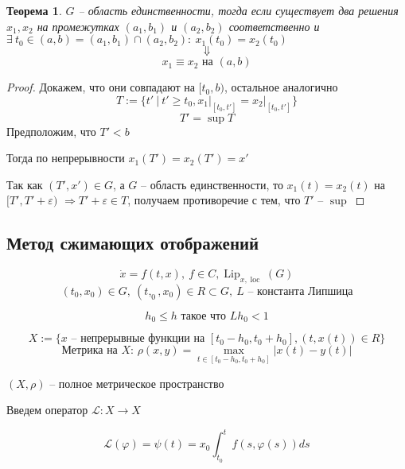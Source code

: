 \documentclass[a4paper]{article}
\theoremstyle{indented}
\newtheorem*{theorem}{Теорема}
\theoremstyle{definition}
\theoremstyle{remark}
\DeclareMathOperator{\Lip}{Lip}
\DeclareMathOperator{\loc}{loc}
\begin{document}
\begin{theorem}
  $G$ -- область единственности, тогда если существует два решения $x_1, x_2$ на промежутках $(a_1,b_1)$ и $(a_2,b_2)$ соответственно и $\exists \ t_0 \in (a,b) = (a_1,b_1) \cap (a_2,b_2): \ x_1(t_0) = x_2(t_0)$
  \[\Downarrow \]
  \[x_1 \equiv x_2 \text{ на }(a,b)\]
\end{theorem}
\begin{proof}
  Докажем, что они совпадают на $[t_0,b)$, остальное аналогично
  \[T :=  \{t' \ | \ t' \geqslant t_0, x_1 |_{[t_0,t']} = x_2 |_{[t_0,t']}\} \]
  \[T' = \sup T\]
  Предположим, что $T' < b$

  Тогда по непрерывности $x_1(T') = x_2(T') = x'$

  Так как $(T',x') \in G$, а $G$ -- область единственности, то $x_1(t) = x_2(t)$ на $[T', T' + \varepsilon)$ $\Rightarrow T' + \varepsilon  \in T $, получаем противоречие с тем, что $T'$ -- $\sup$
\end{proof}

\subsection{Метод сжимающих отображений}

\[\dot x = f(t,x), \ f \in C,\Lip_{x,\loc}(G)\]
\[(t_0,x_0) \in G, \ (t,_0,x_0) \in R \subset G, \ L \text{ -- константа Липшица}\]

\[h_0 \leqslant h \text{ такое что } Lh_0 < 1\]

\[X := \{x \text{ -- непрерывные функции на }[t_0 - h_0,t_0 + h_0], (t,x(t)) \in R\}\]
\[\text{Метрика на $X$: } \rho(x,y) = \max\limits_{t \in [t_0 - h_0,t_0 + h_0]} |x(t) - y(t)|\]
\begin{center}
  $(X, \rho)$ -- полное метрическое пространство
\end{center}

Введем оператор $\mathcal{L} : X \to X$

\[\mathcal{L}(\varphi) = \psi(t) =  x_0 \int_{t_0}^{t}f(s,\varphi(s))ds \]
\end{document}
